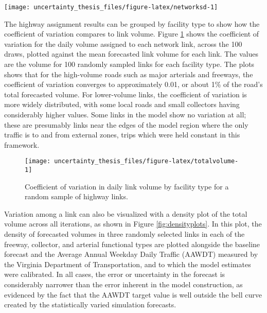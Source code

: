 \documentclass[fancy, masters]{byuthesis}
\begin{document}
\begin{sidewaysfigure}

{\centering \texttt{[image: uncertainty\_thesis\_files/figure-latex/networksd-1]} 

}

\caption{Standard deviation in daily forecasted volume.}\label{fig:networksd}
\end{sidewaysfigure}

The highway assignment results can be grouped by facility type to show how the coefficient of variation compares to link volume. Figure \ref{fig:totalvolume} shows the coefficient of variation for the daily volume assigned to each network link, across the 100 draws, plotted against the mean forecasted link volume for each link. The values are the volume for 100 randomly sampled links for each facility type. The plots shows that for the high-volume roads such as major arterials and freeways, the coefficient of variation converges to approximately 0.01, or about 1\% of the road's total forecasted volume. For lower-volume links, the coefficient of variation is more widely distributed, with some local roads and small collectors having considerably higher values. Some links in the model show no variation at all; these are presumably links near the edges of the model region where the only traffic is to and from external zones, trips which were held constant in this framework.

\begin{figure}

{\centering \texttt{[image: uncertainty\_thesis\_files/figure-latex/totalvolume-1]} 

}

\caption{Coefficient of variation in daily link volume by facility type for a random sample of highway links.}\label{fig:totalvolume}
\end{figure}

Variation among a link can also be visualized with a density plot of the total volume across all iterations, as shown in Figure \ref{fig:densityplots}. In this plot, the density of forecasted volumes in three randomly selected links in each of the freeway, collector, and arterial functional types are plotted alongside the baseline forecast and the Average Annual Weekday Daily Traffic (AAWDT) measured by the Virginia Department of Transportation, and to which the model estimates were calibrated. In all cases, the error or uncertainty in the forecast is considerably narrower than the error inherent in the model construction, as evidenced by the fact that the AAWDT target value is well outside the bell curve created by the statistically varied simulation forecasts.
\end{document}
